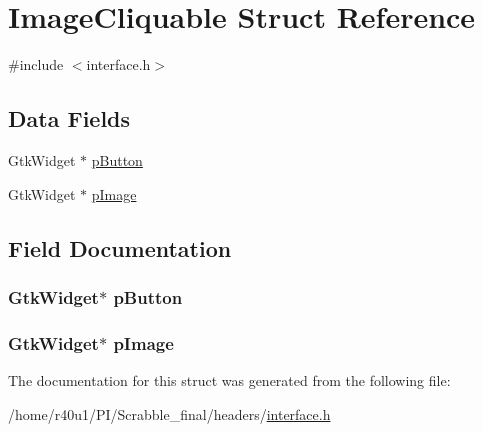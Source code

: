 \hypertarget{struct_image_cliquable}{\section{Image\-Cliquable Struct Reference}
\label{struct_image_cliquable}
}


{\ttfamily \#include $<$interface.\-h$>$}

\subsection*{Data Fields}
\begin{DoxyCompactItemize}
\item 
Gtk\-Widget $\ast$ \hyperlink{struct_image_cliquable_ab419ba2026044cab0230a07a27b30a1c}{p\-Button}
\item 
Gtk\-Widget $\ast$ \hyperlink{struct_image_cliquable_a9c81ae9ebe0645f6eadabbb372b0f1bb}{p\-Image}
\end{DoxyCompactItemize}


\subsection{Field Documentation}
\hypertarget{struct_image_cliquable_ab419ba2026044cab0230a07a27b30a1c}{
\subsubsection[{p\-Button}]{\setlength{\rightskip}{0pt plus 5cm}Gtk\-Widget$\ast$ p\-Button}}\label{struct_image_cliquable_ab419ba2026044cab0230a07a27b30a1c}
\hypertarget{struct_image_cliquable_a9c81ae9ebe0645f6eadabbb372b0f1bb}{
\subsubsection[{p\-Image}]{\setlength{\rightskip}{0pt plus 5cm}Gtk\-Widget$\ast$ p\-Image}}\label{struct_image_cliquable_a9c81ae9ebe0645f6eadabbb372b0f1bb}


The documentation for this struct was generated from the following file\-:\begin{DoxyCompactItemize}
\item 
/home/r40u1/\-P\-I/\-Scrabble\-\_\-final/headers/\hyperlink{interface_8h}{interface.\-h}\end{DoxyCompactItemize}

